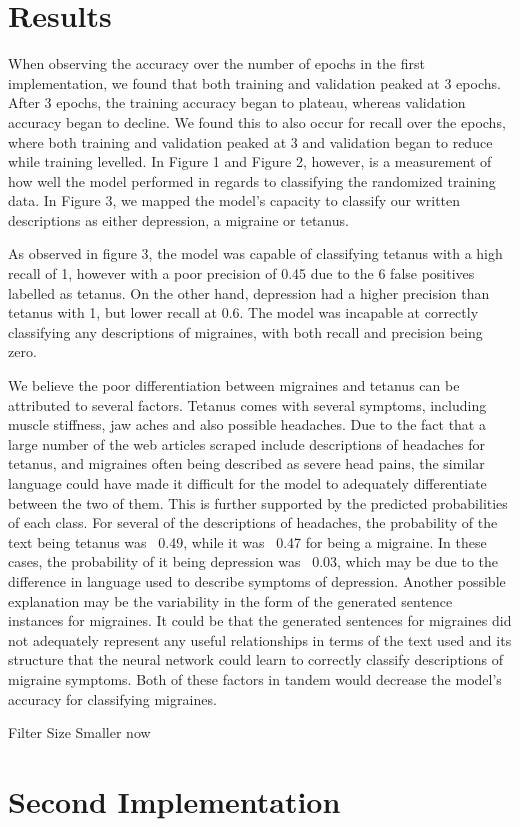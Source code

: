 \documentclass[12pt]{report}
\begin{document}
\section{Results}
When observing the accuracy over the number of epochs in the first
implementation, we found that both training and validation peaked at 3
epochs. After 3 epochs, the training accuracy began to plateau, whereas
validation accuracy began to decline. We found this to also occur for recall
over the epochs, where both training and validation peaked at 3 and
validation began to reduce while training levelled. In Figure 1 and Figure 2,
however, is a measurement of how well the model performed in regards to
classifying the randomized training data. In Figure 3, we mapped the model’s
capacity to classify our written descriptions as either depression, a
migraine or tetanus.

As observed in figure 3, the model was capable of classifying tetanus with a
high recall of 1, however with a poor precision of 0.45 due to the 6 false
positives labelled as tetanus. On the other hand, depression had a higher
precision than tetanus with 1, but lower recall at 0.6. The model was incapable
at correctly classifying any descriptions of migraines, with both recall and
precision being zero.

We believe the poor differentiation between migraines and tetanus can be
attributed to several factors. Tetanus comes with several symptoms, including
muscle stiffness, jaw aches and also possible headaches. Due to the fact that
a large number of the web articles scraped include descriptions of headaches
for tetanus, and migraines often being described as severe head pains, the
similar language could have made it difficult for the model to adequately
differentiate between the two of them. This is further supported by the
predicted probabilities of each class. For several of the descriptions of
headaches, the probability of the text being tetanus was ~0.49, while it was
~0.47 for being a migraine. In these cases, the probability of it being
depression was ~0.03, which may be due to the difference in language used to
describe symptoms of depression. Another possible explanation may be the
variability in the form of the generated sentence instances for migraines. It
could be that the generated sentences for migraines did not adequately
represent any useful relationships in terms of the text used and its
structure that the neural network could learn to correctly classify
descriptions of migraine symptoms. Both of these factors in tandem would
decrease the model’s accuracy for classifying migraines.

Filter Size Smaller now


\section{Second Implementation}


%
\end{document}
